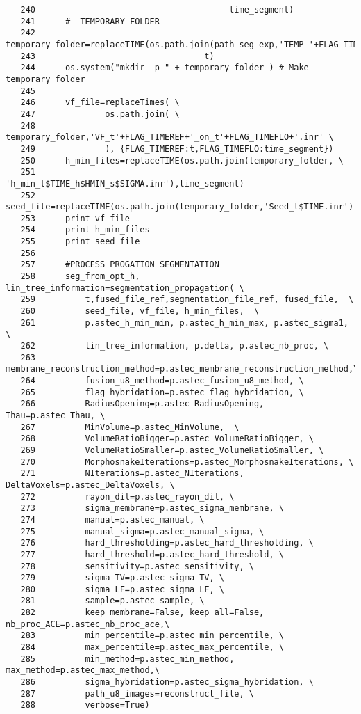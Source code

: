 \documentclass{article}
\begin{document}
\begin{verbatim}
   240	                                     time_segment)
   241	    #  TEMPORARY FOLDER
   242	    temporary_folder=replaceTIME(os.path.join(path_seg_exp,'TEMP_'+FLAG_TIME),\
   243	                                t)
   244	    os.system("mkdir -p " + temporary_folder ) # Make temporary folder
   245	
   246	    vf_file=replaceTimes( \
   247	            os.path.join( \
   248	            temporary_folder,'VF_t'+FLAG_TIMEREF+'_on_t'+FLAG_TIMEFLO+'.inr' \
   249	            ), {FLAG_TIMEREF:t,FLAG_TIMEFLO:time_segment}) 
   250	    h_min_files=replaceTIME(os.path.join(temporary_folder, \
   251	                            'h_min_t$TIME_h$HMIN_s$SIGMA.inr'),time_segment)
   252	    seed_file=replaceTIME(os.path.join(temporary_folder,'Seed_t$TIME.inr'),t)
   253	    print vf_file
   254	    print h_min_files
   255	    print seed_file
   256	
   257	    #PROCESS PROGATION SEGMENTATION
   258	    seg_from_opt_h, lin_tree_information=segmentation_propagation( \
   259	        t,fused_file_ref,segmentation_file_ref, fused_file,  \
   260	        seed_file, vf_file, h_min_files,  \
   261	        p.astec_h_min_min, p.astec_h_min_max, p.astec_sigma1,  \
   262	        lin_tree_information, p.delta, p.astec_nb_proc, \
   263	        membrane_reconstruction_method=p.astec_membrane_reconstruction_method,\
   264	        fusion_u8_method=p.astec_fusion_u8_method, \
   265	        flag_hybridation=p.astec_flag_hybridation, \
   266	        RadiusOpening=p.astec_RadiusOpening, Thau=p.astec_Thau, \
   267	        MinVolume=p.astec_MinVolume,  \
   268	        VolumeRatioBigger=p.astec_VolumeRatioBigger, \
   269	        VolumeRatioSmaller=p.astec_VolumeRatioSmaller, \
   270	        MorphosnakeIterations=p.astec_MorphosnakeIterations, \
   271	        NIterations=p.astec_NIterations, DeltaVoxels=p.astec_DeltaVoxels, \
   272	        rayon_dil=p.astec_rayon_dil, \
   273	        sigma_membrane=p.astec_sigma_membrane, \
   274	        manual=p.astec_manual, \
   275	        manual_sigma=p.astec_manual_sigma, \
   276	        hard_thresholding=p.astec_hard_thresholding, \
   277	        hard_threshold=p.astec_hard_threshold, \
   278	        sensitivity=p.astec_sensitivity, \
   279	        sigma_TV=p.astec_sigma_TV, \
   280	        sigma_LF=p.astec_sigma_LF, \
   281	        sample=p.astec_sample, \
   282	        keep_membrane=False, keep_all=False,  nb_proc_ACE=p.astec_nb_proc_ace,\
   283	        min_percentile=p.astec_min_percentile, \
   284	        max_percentile=p.astec_max_percentile, \
   285	        min_method=p.astec_min_method, max_method=p.astec_max_method,\
   286	        sigma_hybridation=p.astec_sigma_hybridation, \
   287	        path_u8_images=reconstruct_file, \
   288	        verbose=True)
\end{verbatim} 
\end{document}
